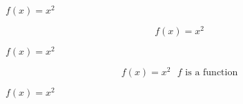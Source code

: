 \documentclass[12pt]{article}
\newcommand\"{quote}
\begin{document}


$f(x) = x^2$

$$f(x) = x^2$$

\(f(x) = x^2\)

\[
  f(x) = x^2 \text{ $f$ is a function}
\]

\ensuremath{f(x) = x^2}
\end{document}
